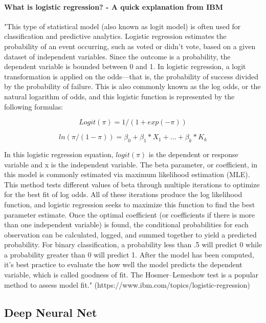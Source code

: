 \documentclass[fleqn,10pt]{SelfArx} %
\begin{document}
\paragraph{What is logistic regression? - A quick explanation from IBM} "This type of statistical model (also known as logit model) is often used for classification and predictive analytics. Logistic regression estimates the probability of an event occurring, such as voted or didn’t vote, based on a given dataset of independent variables. Since the outcome is a probability, the dependent variable is bounded between 0 and 1. In logistic regression, a logit transformation is applied on the odds—that is, the probability of success divided by the probability of failure. This is also commonly known as the log odds, or the natural logarithm of odds, and this logistic function is represented by the following formulas:

\begin{equation}Logit(\pi) = 1/(1+ exp(-\pi))\end{equation}

\begin{equation}ln(\pi/(1-\pi)) = \beta_0 + \beta_1*X_1 + … + \beta_k*K_k\end{equation}

In this logistic regression equation, $logit(\pi)$ is the dependent or response variable and x is the independent variable. The beta parameter, or coefficient, in this model is commonly estimated via maximum likelihood estimation (MLE). This method tests different values of beta through multiple iterations to optimize for the best fit of log odds. All of these iterations produce the log likelihood function, and logistic regression seeks to maximize this function to find the best parameter estimate. Once the optimal coefficient (or coefficients if there is more than one independent variable) is found, the conditional probabilities for each observation can be calculated, logged, and summed together to yield a predicted probability. For binary classification, a probability less than .5 will predict 0 while a probability greater than 0 will predict 1.  After the model has been computed, it’s best practice to evaluate the how well the model predicts the dependent variable, which is called goodness of fit. The Hosmer–Lemeshow test is a popular method to assess model fit." (https://www.ibm.com/topics/logistic-regression)

\subsection{Deep Neural Net}
\end{document}
